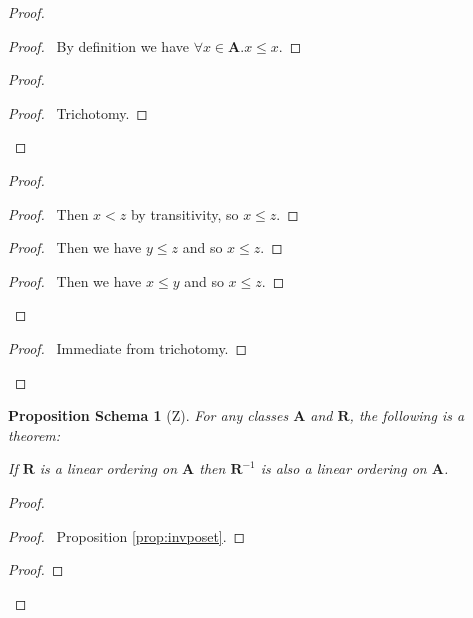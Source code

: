 \documentclass{book}
\let\qed\relax
\newtheorem{props}[ax]{Proposition Schema}
\theoremstyle{definition}
\begin{document}
\begin{proof}
\pf
{}
\begin{proof}
	\pf\ By definition we have $\forall x \in \mathbf{A}. x \leq x$.
\end{proof}
\begin{proof}
	\begin{proof}
		\pf\ Trichotomy.
	\end{proof}
\end{proof}
\begin{proof}
	\begin{proof}
		\pf\ Then $x < z$ by transitivity, so $x \leq z$.
	\end{proof}
	\begin{proof}
		\pf\ Then we have $y \leq z$ and so $x \leq z$.
	\end{proof}
	\begin{proof}
		\pf\ Then we have $x \leq y$ and so $x \leq z$.
	\end{proof}
\end{proof}
\begin{proof}
	\pf\ Immediate from trichotomy.
\end{proof}
\qed
\end{proof}

\begin{props}[Z]
For any classes $\mathbf{A}$ and $\mathbf{R}$, the following is a theorem:

If $\mathbf{R}$ is a linear ordering on $\mathbf{A}$ then $\mathbf{R}^{-1}$ is also a linear ordering on $\mathbf{A}$.
\end{props}

\begin{proof}
\pf
{}
\begin{proof}
	\pf\ Proposition \ref{prop:invposet}.
\end{proof}
\begin{proof}
\end{proof}
\qed
\end{proof}
\end{document}
